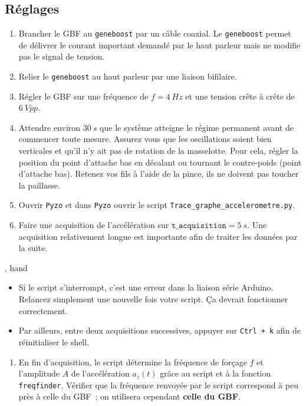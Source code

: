 \documentclass[a4paper, 11pt, final, garamond]{book}
\begin{document}
\subsection{Réglages}
\begin{enumerate}
    \item Brancher le GBF au \texttt{geneboost} par un câble coaxial. Le
        \texttt{geneboost} permet de délivrer le courant important demandé par
        le haut parleur mais ne modifie pas le signal de tension. 
    \item Relier le \texttt{geneboost} au haut parleur par une liaison bifilaire. 
    \item Régler le GBF sur une fréquence de $f = \SI{4}{Hz}$ et une tension
        crête à crête de $\SI{6}{Vpp}$.
    \item Attendre environ $\SI{30}{s}$ que le système atteigne le régime
        permanent avant de commencer toute mesure. Assurez vous que les
        oscillations soient bien verticales et qu'il n'y ait pas de rotation de
        la masselotte. Pour cela, régler la position du point d'attache bas en
        décalant ou tournant le contre-poids (point d'attache bas). Retenez vos
        fils à l'aide de la pince, ils ne doivent pas toucher la paillasse. 
    \item Ouvrir \texttt{Pyzo} et dans \texttt{Pyzo} ouvrir le script
        \texttt{Trace\_graphe\_accelerometre.py}.
    \item Faire une acquisition de l'accélération sur $\texttt{t\_acquisition} =
        \SI{5}{s}$. Une acquisition relativement longue est importante afin de
        traiter les données par la suite.
\end{enumerate}
\begin{timpo}{, hand}
    \begin{itemize}
        \item Si le script s'interrompt, c'est une erreur dans la liaison série
            Arduino. Relancez simplement une nouvelle fois votre script. Ça devrait
            fonctionner correctement.
        \item Par ailleurs, entre deux acquisitions successives, appuyer sur
            \texttt{Ctrl + k} afin de réinitialiser le shell.
    \end{itemize}
\end{timpo}
\begin{enumerate}[resume]
    \item En fin d'acquisition, le script détermine la fréquence de forçage $f$
        et l'amplitude $A$ de l'accélération $a_z(t)$ grâce au script et à la
        fonction \texttt{freqfinder}. Vérifier que la fréquence renvoyée par le
        script correspond à peu près à celle du GBF~; on utilisera cependant
        \textbf{celle du GBF}.
\end{enumerate}
\end{document}
